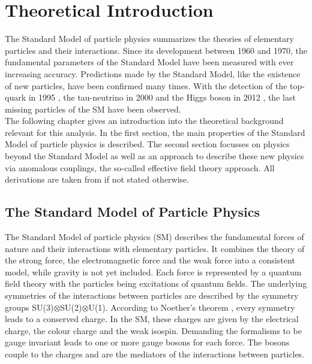 \chapter{Theoretical Introduction}
\label{chap::TheoreticalIntroduction}
The Standard Model of particle physics summarizes the theories of elementary particles and their interactions. Since its development between 1960 and 1970, the fundamental parameters of the Standard Model have been measured with ever increasing accuracy. Predictions made by the Standard Model, like the existence of new particles, have been confirmed many times. With the detection of the top-quark in 1995 \cite{top_detection1,top_detection2}, the tau-neutrino in 2000 \cite{tau_nu_detection} and the Higgs boson in 2012 \cite{cms_higgsdiscov,atlas_higgsdiscov}, the last missing particles of the SM have been observed.\\

The following chapter gives an introduction into the theoretical background relevant for this analysis. In the first section, the main properties of the Standard Model of particle physics is described. The second section focusses on physics beyond the Standard Model as well as an approach to describe these new physics via anomalous couplings, the so-called effective field theory approach. All derivations are taken from \cite{peskin,mandl} if not stated otherwise.

\section{The Standard Model of Particle Physics}
The Standard Model of particle physics (SM) describes the fundamental forces of nature and their interactions with elementary particles. It combines the theory of the strong force, the electromagnetic force and the weak force into a consistent model, while gravity is not yet included. Each force is represented by a quantum field theory with the particles being excitations of quantum fields. The underlying symmetries of the interactions between particles are described by the symmetry groups SU(3)$\otimes$SU(2)$\otimes$U(1). According to Noether's theorem \cite{noether}, every symmetry leads to a conserved charge. In the SM, these charges are given by the electrical charge, the colour charge and the weak isospin. Demanding the formalisms to be gauge invariant leads to one or more gauge bosons for each force. The bosons couple to the charges and are the mediators of the interactions between particles.\\

